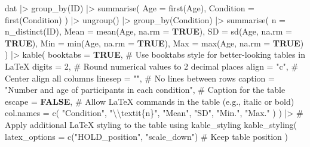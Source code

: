 \documentclass[
  bookmarksnumbered]{article}
\newenvironment{Shaded}{\begin{snugshade}}{\end{snugshade}}
\newcommand{\AttributeTok}[1]{\textcolor[rgb]{0.80,0.80,0.80}{#1}}
\newcommand{\CommentTok}[1]{\textcolor[rgb]{0.50,0.62,0.50}{#1}}
\newcommand{\ConstantTok}[1]{\textcolor[rgb]{0.86,0.64,0.64}{\textbf{#1}}}
\newcommand{\DecValTok}[1]{\textcolor[rgb]{0.86,0.86,0.80}{#1}}
\newcommand{\FunctionTok}[1]{\textcolor[rgb]{0.94,0.94,0.56}{#1}}
\newcommand{\NormalTok}[1]{\textcolor[rgb]{0.80,0.80,0.80}{#1}}
\newcommand{\SpecialCharTok}[1]{\textcolor[rgb]{0.86,0.64,0.64}{#1}}
\newcommand{\StringTok}[1]{\textcolor[rgb]{0.80,0.58,0.58}{#1}}
\begin{document}
\begin{Shaded}
\begin{Highlighting}[]
\NormalTok{dat }\SpecialCharTok{|\textgreater{}}
  \FunctionTok{group\_by}\NormalTok{(ID) }\SpecialCharTok{|\textgreater{}}
  \FunctionTok{summarise}\NormalTok{(}
    \AttributeTok{Age =} \FunctionTok{first}\NormalTok{(Age),}
    \AttributeTok{Condition =} \FunctionTok{first}\NormalTok{(Condition)}
\NormalTok{  ) }\SpecialCharTok{|\textgreater{}}
  \FunctionTok{ungroup}\NormalTok{() }\SpecialCharTok{|\textgreater{}}
  \FunctionTok{group\_by}\NormalTok{(Condition) }\SpecialCharTok{|\textgreater{}}
  \FunctionTok{summarise}\NormalTok{(}
    \AttributeTok{n =} \FunctionTok{n\_distinct}\NormalTok{(ID),}
    \AttributeTok{Mean =} \FunctionTok{mean}\NormalTok{(Age, }\AttributeTok{na.rm =} \ConstantTok{TRUE}\NormalTok{),}
    \AttributeTok{SD =} \FunctionTok{sd}\NormalTok{(Age, }\AttributeTok{na.rm =} \ConstantTok{TRUE}\NormalTok{),}
    \AttributeTok{Min =} \FunctionTok{min}\NormalTok{(Age, }\AttributeTok{na.rm =} \ConstantTok{TRUE}\NormalTok{),}
    \AttributeTok{Max =} \FunctionTok{max}\NormalTok{(Age, }\AttributeTok{na.rm =} \ConstantTok{TRUE}\NormalTok{)}
\NormalTok{  ) }\SpecialCharTok{|\textgreater{}}
  \FunctionTok{kable}\NormalTok{(}
    \AttributeTok{booktabs =} \ConstantTok{TRUE}\NormalTok{, }\CommentTok{\# Use \textquotesingle{}booktabs\textquotesingle{} style for better{-}looking tables in LaTeX}
    \AttributeTok{digits =} \DecValTok{2}\NormalTok{, }\CommentTok{\# Round numerical values to 2 decimal places}
    \AttributeTok{align =} \StringTok{"c"}\NormalTok{, }\CommentTok{\# Center align all columns}
    \AttributeTok{linesep =} \StringTok{""}\NormalTok{, }\CommentTok{\# No lines between rows}
    \AttributeTok{caption =} \StringTok{"Number and age of participants in each condition"}\NormalTok{,}
    \CommentTok{\# Caption for the table}
    \AttributeTok{escape =} \ConstantTok{FALSE}\NormalTok{, }\CommentTok{\# Allow LaTeX commands in the table (e.g., italic or bold)}
    \AttributeTok{col.names =} \FunctionTok{c}\NormalTok{(}
      \StringTok{"Condition"}\NormalTok{,}
      \StringTok{"}\SpecialCharTok{\textbackslash{}\textbackslash{}}\StringTok{textit\{n\}"}\NormalTok{,}
      \StringTok{"Mean"}\NormalTok{,}
      \StringTok{"SD"}\NormalTok{,}
      \StringTok{"Min."}\NormalTok{,}
      \StringTok{"Max."}
\NormalTok{    )}
\NormalTok{  ) }\SpecialCharTok{|\textgreater{}}
  \CommentTok{\# Apply additional LaTeX styling to the table using \textquotesingle{}kable\_styling\textquotesingle{}}
  \FunctionTok{kable\_styling}\NormalTok{(}
    \AttributeTok{latex\_options =} \FunctionTok{c}\NormalTok{(}\StringTok{"HOLD\_position"}\NormalTok{, }\StringTok{"scale\_down"}\NormalTok{) }\CommentTok{\# Keep table position}
\NormalTok{  )}
\end{Highlighting}
\end{Shaded}
\end{document}
